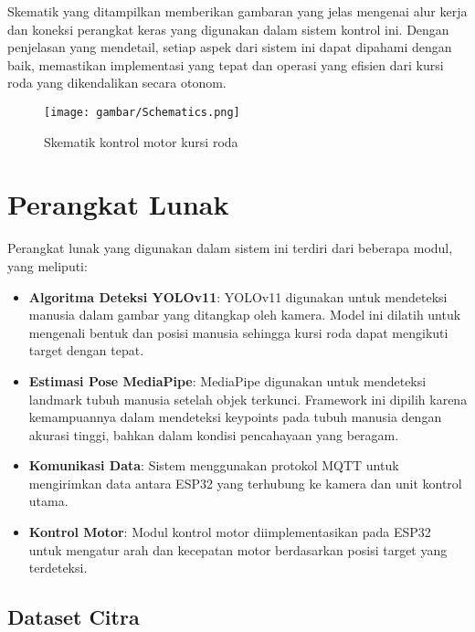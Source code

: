 Skematik yang ditampilkan memberikan gambaran yang jelas mengenai alur kerja dan koneksi perangkat keras yang digunakan dalam sistem kontrol ini. Dengan penjelasan yang mendetail, setiap aspek dari sistem ini dapat dipahami dengan baik, memastikan implementasi yang tepat dan operasi yang efisien dari kursi roda yang dikendalikan secara otonom. \parencite{ekatama2024perancangan}

\begin{figure}[H]
  \centering

  \texttt{[image: gambar/Schematics.png]}

  \caption{Skematik kontrol motor kursi roda}
  \label{fig:Skematik Kontrol motor Kursi roda.}
\end{figure}

\section{Perangkat Lunak}
\label{sec:perangkatlunak}

Perangkat lunak yang digunakan dalam sistem ini terdiri dari beberapa modul, yang meliputi:

\begin{itemize}[nolistsep]
    \item \textbf{Algoritma Deteksi YOLOv11}: YOLOv11 digunakan untuk mendeteksi manusia dalam gambar yang ditangkap oleh kamera. Model ini dilatih untuk mengenali bentuk dan posisi manusia sehingga kursi roda dapat mengikuti target dengan tepat.
    \item \textbf{Estimasi Pose MediaPipe}: MediaPipe digunakan untuk mendeteksi landmark tubuh manusia setelah objek terkunci. Framework ini dipilih karena kemampuannya dalam mendeteksi keypoints pada tubuh manusia dengan akurasi tinggi, bahkan dalam kondisi pencahayaan yang beragam.
    \item \textbf{Komunikasi Data}: Sistem menggunakan protokol MQTT untuk mengirimkan data antara ESP32 yang terhubung ke kamera dan unit kontrol utama.
    \item \textbf{Kontrol Motor}: Modul kontrol motor diimplementasikan pada ESP32 untuk mengatur arah dan kecepatan motor berdasarkan posisi target yang terdeteksi.
\end{itemize}

\subsection{Dataset Citra}
\label{subsec:datasetcitra}

